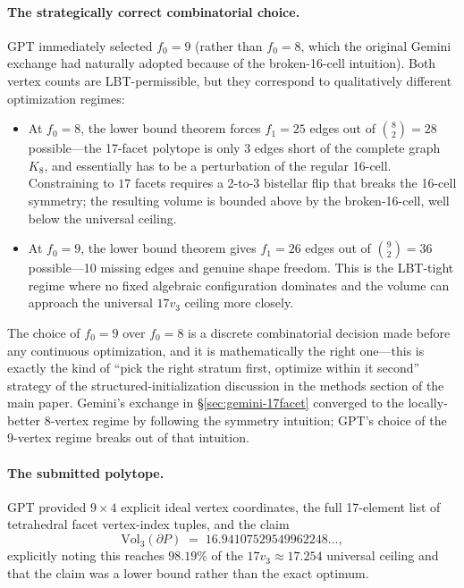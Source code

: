 \documentclass[11pt]{article}
\begin{document}
\paragraph{The strategically correct combinatorial choice.}
GPT immediately selected $f_0 = 9$ (rather than $f_0 = 8$, which
the original Gemini exchange had naturally adopted because of the
broken-16-cell intuition).  Both vertex counts are LBT-permissible,
but they correspond to qualitatively different optimization regimes:
\begin{itemize}
\item At $f_0 = 8$, the lower bound theorem forces $f_1 = 25$ edges
      out of $\binom{8}{2} = 28$ possible---the 17-facet polytope
      is only 3 edges short of the complete graph $K_8$, and
      essentially has to be a perturbation of the regular 16-cell.
      Constraining to $17$ facets requires a 2-to-3 bistellar flip
      that breaks the 16-cell symmetry; the resulting volume is
      bounded above by the broken-16-cell, well below the universal
      ceiling.
\item At $f_0 = 9$, the lower bound theorem gives $f_1 = 26$ edges
      out of $\binom{9}{2} = 36$ possible---10 missing edges and
      genuine shape freedom.  This is the LBT-tight regime where
      no fixed algebraic configuration dominates and the volume
      can approach the universal $17 v_3$ ceiling more closely.
\end{itemize}
The choice of $f_0 = 9$ over $f_0 = 8$ is a discrete combinatorial
decision made before any continuous optimization, and it is
mathematically the right one---this is exactly the kind of
``pick the right stratum first, optimize within it second''
strategy of the structured-initialization discussion in the
methods section of the main paper.  Gemini's exchange in \S\ref{sec:gemini-17facet} converged
to the locally-better 8-vertex regime by following the symmetry
intuition; GPT's choice of the 9-vertex regime breaks out of that
intuition.

\paragraph{The submitted polytope.}
GPT provided $9 \times 4$ explicit ideal vertex coordinates,
the full 17-element list of tetrahedral facet vertex-index tuples,
and the claim
\[
  \mathrm{Vol}_3(\partial P) \;=\; 16.94107529549962248\ldots,
\]
explicitly noting this reaches $98.19\%$ of the $17 v_3 \approx
17.254$ universal ceiling and that the claim was a lower bound
rather than the exact optimum.
\end{document}
